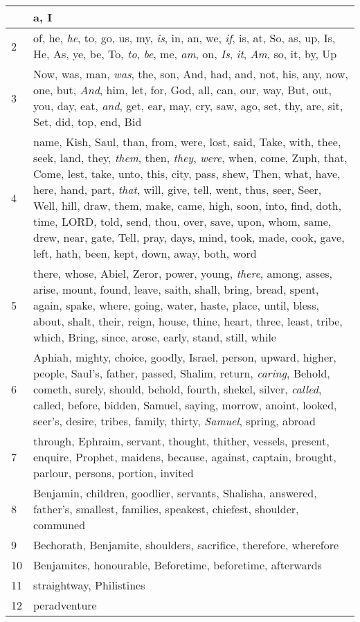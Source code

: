 \begin{longtable}{l|p{3.75in}}
\hline \hline
\endlastfoot
1 & a, I \\ \hline
2 & of, he, \emph{he}, to, go, us, my, \emph{is}, in, an, we, \emph{if}, is, at, So, as, up, Is, He, As, ye, be, To, \emph{to}, \emph{be}, me, \emph{am}, on, \emph{Is}, \emph{it}, \emph{Am}, so, it, by, Up \\ \hline
3 & Now, was, man, \emph{was}, the, son, And, had, and, not, his, any, now, one, but, \emph{And}, him, let, for, God, all, can, our, way, But, out, you, day, eat, \emph{and}, get, ear, may, cry, saw, ago, set, thy, are, sit, Set, did, top, end, Bid \\ \hline
4 & name, Kish, Saul, than, from, were, lost, said, Take, with, thee, seek, land, they, \emph{them}, then, \emph{they}, \emph{were}, when, come, Zuph, that, Come, lest, take, unto, this, city, pass, shew, Then, what, have, here, hand, part, \emph{that}, will, give, tell, went, thus, seer, Seer, Well, hill, draw, them, make, came, high, soon, into, find, doth, time, LORD, told, send, thou, over, save, upon, whom, same, drew, near, gate, Tell, pray, days, mind, took, made, cook, gave, left, hath, been, kept, down, away, both, word \\ \hline
5 & there, whose, Abiel, Zeror, power, young, \emph{there}, among, asses, arise, mount, found, leave, saith, shall, bring, bread, spent, again, spake, where, going, water, haste, place, until, bless, about, shalt, their, reign, house, thine, heart, three, least, tribe, which, Bring, since, arose, early, stand, still, while \\ \hline
6 & Aphiah, mighty, choice, goodly, Israel, person, upward, higher, people, Saul's, father, passed, Shalim, return, \emph{caring}, Behold, cometh, surely, should, behold, fourth, shekel, silver, \emph{called}, called, before, bidden, Samuel, saying, morrow, anoint, looked, seer's, desire, tribes, family, thirty, \emph{Samuel}, spring, abroad \\ \hline
7 & through, Ephraim, servant, thought, thither, vessels, present, enquire, Prophet, maidens, because, against, captain, brought, parlour, persons, portion, invited \\ \hline
8 & Benjamin, children, goodlier, servants, Shalisha, answered, father's, smallest, families, speakest, chiefest, shoulder, communed \\ \hline
9 & Bechorath, Benjamite, shoulders, sacrifice, therefore, wherefore \\ \hline
10 & Benjamites, honourable, Beforetime, beforetime, afterwards \\ \hline
11 & straightway, Philistines \\ \hline
12 & peradventure \\ \hline
\end{longtable}






